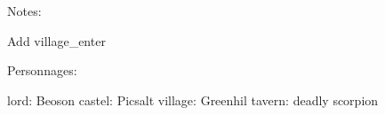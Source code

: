 Notes:

Add {village_enter}

Personnages:

lord: Beoson
castel: Picsalt
village: Greenhil
tavern: deadly scorpion






